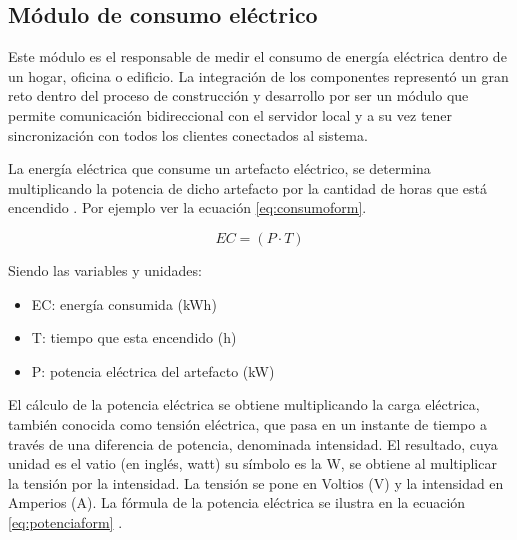 
\subsection{Módulo de consumo eléctrico}

Este módulo es el responsable de medir el consumo de energía eléctrica dentro de un hogar, oficina o edificio. La integración de los componentes representó un gran reto dentro del proceso de construcción y desarrollo por ser un módulo que permite comunicación bidireccional con el servidor local y a su vez tener sincronización con todos los clientes conectados al sistema.

\vspace{2cm}


La energía eléctrica que consume un artefacto eléctrico, se determina multiplicando la potencia de dicho artefacto por la cantidad de horas que está encendido \citep{BOOK:3}. Por ejemplo ver la ecuación \ref{eq:consumoform}.

\begin{equation}
	\label{eq:consumoform}
	EC = \left( P \cdot T \right)
\end{equation}

\vspace{0.1cm}
Siendo las variables y unidades:
\begin{itemize}
\item EC: energía consumida (kWh)
\item T: tiempo que esta encendido (h)
\item P: potencia eléctrica del artefacto (kW)
\end{itemize}

\vspace{0.1cm}

El cálculo de la potencia eléctrica se obtiene multiplicando la carga eléctrica, también conocida como tensión eléctrica, que pasa en un instante de tiempo a través de una diferencia de potencia, denominada intensidad. El resultado, cuya unidad es el vatio (en inglés, watt) su símbolo es la W, se obtiene al multiplicar la tensión por la intensidad. La tensión se pone en Voltios (V) y la intensidad en Amperios (A). La fórmula de la potencia eléctrica se ilustra en la ecuación \ref{eq:potenciaform} \citep{WEBSITE:20}.

